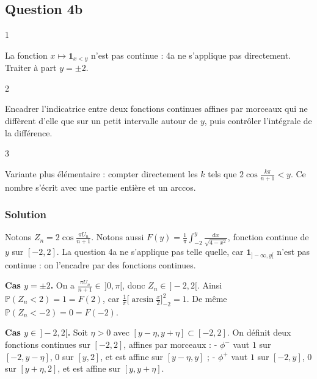 \documentclass[11pt,a4paper]{article}
\begin{document}
\hypertarget{question-4b}{%
\subsection{Question 4b}\label{question-4b}}

\begin{indication}{1}

La fonction \(x\mapsto\mathbf 1_{x<y}\) n'est pas continue : 4a ne s'applique pas directement. Traiter à part \(y=\pm2\).

\end{indication}

\begin{indication}{2}

Encadrer l'indicatrice entre deux fonctions continues affines par morceaux qui ne diffèrent d'elle que sur un petit intervalle autour de \(y\), puis contrôler l'intégrale de la différence.

\end{indication}

\begin{indication}{3}

Variante plus élémentaire : compter directement les \(k\) tels que \(2\cos\frac{k\pi}{n+1}<y\). Ce nombre s'écrit avec une partie entière et un arccos.

\end{indication}

\hypertarget{solution-6}{%
\subsubsection{Solution}\label{solution-6}}

Notons \(Z_n=2\cos\frac{\pi U_n}{n+1}\). Notons aussi \(F(y)=\frac1\pi\int_{-2}^y\frac{\mathrm dx}{\sqrt{4-x^2}}\), fonction continue de \(y\) sur \([-2,2]\). La question 4a ne s'applique pas telle quelle, car \(\mathbf 1_{]-\infty,y[}\) n'est pas continue : on l'encadre par des fonctions continues.

\textbf{Cas \(y=\pm2\).} On a \(\frac{\pi U_n}{n+1}\in\,]0,\pi[\), donc \(Z_n\in\,]-2,2[\). Ainsi \(\mathbb P(Z_n<2)=1=F(2)\), car \(\frac1\pi\big[\arcsin\frac x2\big]_{-2}^2=1\). De même \(\mathbb P(Z_n<-2)=0=F(-2)\).

\textbf{Cas \(y\in\,]-2,2[\).} Soit \(\eta>0\) avec \([y-\eta,y+\eta]\subset[-2,2]\). On définit deux fonctions continues sur \([-2,2]\), affines par morceaux :
- \(\phi^-\) vaut \(1\) sur \([-2,y-\eta]\), \(0\) sur \([y,2]\), et est affine sur \([y-\eta,y]\) ;
- \(\phi^+\) vaut \(1\) sur \([-2,y]\), \(0\) sur \([y+\eta,2]\), et est affine sur \([y,y+\eta]\).
\end{document}
